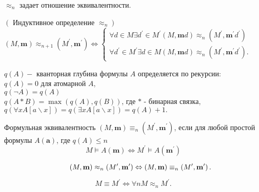 \begin{lem}
$\approx_{n}$ задает отношение эквивалентности.
\end{lem}
\begin{lem}
$\left(\right.$ Индуктивное определение $\left.\approx_{n}\right)$
$(M, \mathbf{m}) \approx_{n+1}\left(M^{\prime}, \mathbf{m}^{\prime}\right) \Leftrightarrow\left\{\begin{array}{l}\forall d \in M \exists d^{\prime} \in M^{\prime}(M, \mathbf{m} d) \approx_{n}\left(M^{\prime}, \mathbf{m}^{\prime} d^{\prime}\right) \\ \forall d^{\prime} \in M^{\prime} \exists d \in M(M, \mathbf{m} d) \approx_{n}\left(M^{\prime}, \mathbf{m}^{\prime} d^{\prime}\right).\end{array}\right.$
\end{lem}

\begin{defn}
$q(A)-$ кванторная глубина формулы $A$ определяется по рекурсии:\\
$q(A)=0$ для атомарной $A$,\\
$q(\neg A)=q(A)$\\
$q(A * B)=\max (q(A), q(B))$, где $*$ - бинарная связка,\\
$q(\forall x A[a \backslash x])=q(\exists x A[a \backslash x])=q(A)+1.$
\end{defn}
\begin{defn}
Формульная эквивалентность $(M, \mathbf{m}) \equiv_{n}\left(M^{\prime}, \mathbf{m}^{\prime}\right)$, если
для любой простой формулы $A(\mathbf{a})$, где $q(A) \leq n$
$$
M \vDash A(\mathbf{m}) \Leftrightarrow M^{\prime} \vDash A\left(\mathbf{m}^{\prime}\right)
$$
\end{defn}

\begin{theo}
$$
\qquad(M, \mathbf{m}) \approx_{n}\left(M^{\prime}, \mathbf{m}^{\prime}\right) \Leftrightarrow(M, \mathbf{m}) \equiv_{n}\left(M^{\prime}, \mathbf{m}^{\prime}\right). \\
$$
\end{theo}
\begin{corol}
$$
M \equiv M^{\prime} \Leftrightarrow \forall n M \approx_{n} M^{\prime}.
$$
\end{corol}


